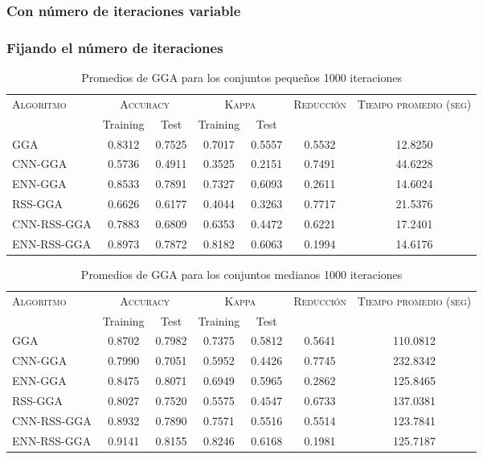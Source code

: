 \subsubsection{Con número de iteraciones variable}

\subsubsection{Fijando el número de iteraciones}

\begin{table}[]
\centering
\begin{tabular}{l c c c c c c}
\hline
\multirow{2}{*}{\textsc{Algoritmo}}
	& \multicolumn{2}{c}{\textsc{Accuracy}}
	& \multicolumn{2}{c}{\textsc{Kappa}}
	& \textsc{Reducción}
	& \textsc{Tiempo promedio (seg)} \\
	& Training & Test
	& Training & Test \\ 
\hline
\hline

GGA         & 0.8312 & 0.7525 & 0.7017 & 0.5557 & 0.5532 & 12.8250 \\
CNN-GGA     & 0.5736 & 0.4911 & 0.3525 & 0.2151 & 0.7491 & 44.6228 \\
ENN-GGA     & 0.8533 & 0.7891 & 0.7327 & 0.6093 & 0.2611 & 14.6024 \\
RSS-GGA     & 0.6626 & 0.6177 & 0.4044 & 0.3263 & 0.7717 & 21.5376 \\
CNN-RSS-GGA & 0.7883 & 0.6809 & 0.6353 & 0.4472 & 0.6221 & 17.2401 \\
ENN-RSS-GGA & 0.8973 & 0.7872 & 0.8182 & 0.6063 & 0.1994 & 14.6176 \\

\hline
\end{tabular}
\caption{Promedios de GGA para los conjuntos pequeños 1000 iteraciones}
\label{peq-gga}
\end{table}

\begin{table}[]
\centering
\begin{tabular}{l c c c c c c}
\hline
\multirow{2}{*}{\textsc{Algoritmo}}
	& \multicolumn{2}{c}{\textsc{Accuracy}}
	& \multicolumn{2}{c}{\textsc{Kappa}}
	& \textsc{Reducción}
	& \textsc{Tiempo promedio (seg)} \\
	& Training & Test
	& Training & Test \\ 
\hline
\hline

GGA         & 0.8702 & 0.7982 & 0.7375 & 0.5812 & 0.5641 & 110.0812 \\
CNN-GGA     & 0.7990 & 0.7051 & 0.5952 & 0.4426 & 0.7745 & 232.8342 \\
ENN-GGA     & 0.8475 & 0.8071 & 0.6949 & 0.5965 & 0.2862 & 125.8465 \\
RSS-GGA     & 0.8027 & 0.7520 & 0.5575 & 0.4547 & 0.6733 & 137.0381 \\
CNN-RSS-GGA & 0.8932 & 0.7890 & 0.7571 & 0.5516 & 0.5514 & 123.7841 \\
ENN-RSS-GGA & 0.9141 & 0.8155 & 0.8246 & 0.6168 & 0.1981 & 125.7187 \\

\hline
\end{tabular}
\caption{Promedios de GGA para los conjuntos medianos 1000 iteraciones}
\label{med-gga}
\end{table}

